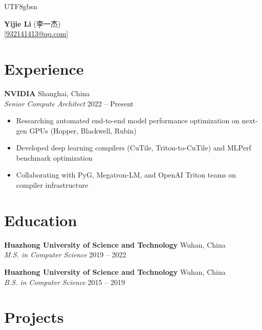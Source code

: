 \documentclass[11pt,a4paper]{article}
\begin{document}
\begin{CJK}{UTF8}{gbsn}

\begin{center}
    {\Huge\bfseries Yijie Li} (李一杰) \\[8pt]
    [\href{mailto:932141413@qq.com}{932141413@qq.com}] \quad
    [+86 176-1274-6066]
\end{center}

\vspace{2pt}

\section{Experience}

\noindent\textbf{NVIDIA} \hfill Shanghai, China \\
\textit{Senior Compute Architect} \hfill 2022 -- Present
\begin{itemize}
    \item Researching automated end-to-end model performance optimization on next-gen GPUs (Hopper, Blackwell, Rubin)
    \item Developed deep learning compilers (CuTile, Triton-to-CuTile) and MLPerf benchmark optimization
    \item Collaborating with PyG, Megatron-LM, and OpenAI Triton teams on compiler infrastructure
\end{itemize}

\vspace{4pt}

\section{Education}

\noindent\textbf{Huazhong University of Science and Technology} \hfill Wuhan, China \\
\textit{M.S. in Computer Science} \hfill 2019 -- 2022

\vspace{6pt}

\noindent\textbf{Huazhong University of Science and Technology} \hfill Wuhan, China \\
\textit{B.S. in Computer Science} \hfill 2015 -- 2019

\vspace{4pt}

\section{Projects}


\end{CJK}
\end{document}
